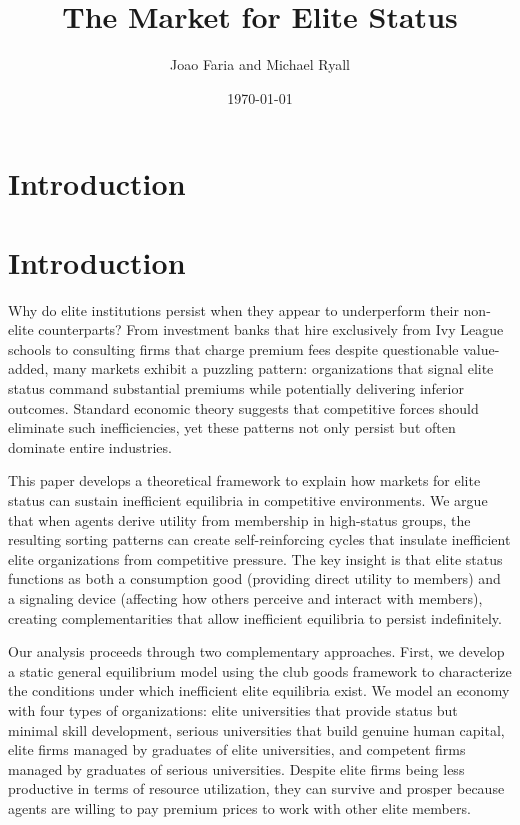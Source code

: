 \documentclass[12pt,letterpaper]{article}
\title{The Market for Elite Status}
\author{Joao Faria and Michael Ryall}
\date{\today}
\begin{document}
	
	\maketitle

	
	
	\onehalfspacing
	
\section{Introduction}
	\section{Introduction}
	
	Why do elite institutions persist when they appear to underperform their non-elite counterparts? From investment banks that hire exclusively from Ivy League schools to consulting firms that charge premium fees despite questionable value-added, many markets exhibit a puzzling pattern: organizations that signal elite status command substantial premiums while potentially delivering inferior outcomes. Standard economic theory suggests that competitive forces should eliminate such inefficiencies, yet these patterns not only persist but often dominate entire industries.
	
	This paper develops a theoretical framework to explain how markets for elite status can sustain inefficient equilibria in competitive environments. We argue that when agents derive utility from membership in high-status groups, the resulting sorting patterns can create self-reinforcing cycles that insulate inefficient elite organizations from competitive pressure. The key insight is that elite status functions as both a consumption good (providing direct utility to members) and a signaling device (affecting how others perceive and interact with members), creating complementarities that allow inefficient equilibria to persist indefinitely.
	
	Our analysis proceeds through two complementary approaches. First, we develop a static general equilibrium model using the club goods framework to characterize the conditions under which inefficient elite equilibria exist. We model an economy with four types of organizations: elite universities that provide status but minimal skill development, serious universities that build genuine human capital, elite firms managed by graduates of elite universities, and competent firms managed by graduates of serious universities. Despite elite firms being less productive in terms of resource utilization, they can survive and prosper because agents are willing to pay premium prices to work with other elite members.
	
\end{document}
